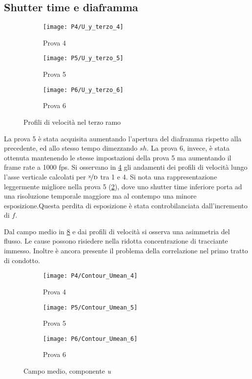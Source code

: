 \documentclass{article} %
\newcommand{\xd}{\nicefrac{\textrm{x}}{\textrm{D}}}
\begin{document}
\subsection{Shutter time e diaframma}
\begin{figure}[ht!] 
	\centering
	\begin{subfigure}{0.3\textwidth}
		\texttt{[image: P4/U\_y\_terzo\_4]}
		\caption{Prova 4}
		\label{fig:terzo_p4}
	\end{subfigure} \quad
	\begin{subfigure}{0.3\textwidth}
		\texttt{[image: P5/U\_y\_terzo\_5]}
		\caption{Prova 5}
		\label{fig:terzo_p5}
	\end{subfigure} \quad
	\begin{subfigure}{0.3\textwidth}
		\texttt{[image: P6/U\_y\_terzo\_6]}
		\caption{Prova 6}
		\label{fig:terzo_p6}
	\end{subfigure}
	\caption{Profili di velocità nel terzo ramo}
	\label{fig:profili_terzoramo_p45}
\end{figure}
La prova 5 è stata acquisita aumentando l'apertura del diaframma rispetto alla precedente, ed allo stesso tempo dimezzando $sh$. La prova 6, invece, è stata ottenuta mantenendo le stesse impostazioni della prova 5 ma aumentando il frame rate a 1000 fps. Si osservano in \cref{fig:profili_terzoramo_p45} gli andamenti dei profili di velocità lungo l'asse verticale calcolati per $\xd$ tra 1 e 4. Si nota una rappresentazione leggermente migliore nella prova 5 (\cref{fig:terzo_p5}), dove uno shutter time inferiore porta ad una risoluzione temporale maggiore ma al contempo una minore esposizione.Questa perdita di esposizione è stata controbilanciata dall'incremento di $f$.\par
Dal campo medio in \cref{fig:cm_45} e dai profili di velocità si osserva una asimmetria del flusso. Le cause possono risiedere nella ridotta concentrazione di tracciante immesso. Inoltre è ancora presente il problema della correlazione nel primo tratto di condotto.\par
\begin{figure}[h!] 
	\centering
	\begin{subfigure}{0.3\textwidth}
		\texttt{[image: P4/Contour\_Umean\_4]}
		\caption{Prova 4}
		\label{fig:cm_p4-1}
	\end{subfigure} \quad
	\begin{subfigure}{0.3\textwidth}
		\texttt{[image: P5/Contour\_Umean\_5]}
		\caption{Prova 5}
		\label{fig:cm_p5}
	\end{subfigure}\quad
	\begin{subfigure}{0.3\textwidth}
		\texttt{[image: P6/Contour\_Umean\_6]}
		\caption{Prova 6}
		\label{fig:cm_p6}
	\end{subfigure}
	\caption{Campo medio, componente \textit{u}}
	\label{fig:cm_45}
\end{figure}
\clearpage
\end{document}
